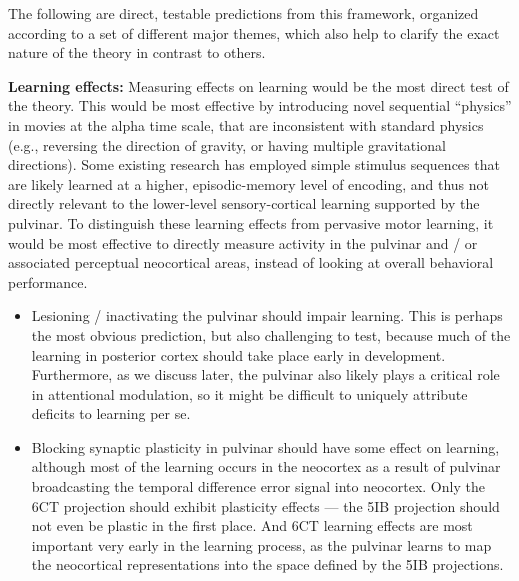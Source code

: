 \documentclass[11pt,twoside]{article}
\newif\myifpdf
\begin{document}
The following are direct, testable predictions from this framework, organized according to a set of different major themes, which also help to clarify the exact nature of the theory in contrast to others.

{\bf Learning effects:} Measuring effects on learning would be the most direct test of the theory.  This would be most effective by introducing novel sequential ``physics'' in movies at the alpha time scale, that are inconsistent with standard physics (e.g., reversing the direction of gravity, or having multiple gravitational directions).  Some existing research has employed simple stimulus sequences \cite{GavornikBear14,FiserMahringerOyiboEtAl16} that are likely learned at a higher, episodic-memory level of encoding, and thus not directly relevant to the lower-level sensory-cortical learning supported by the pulvinar.  To distinguish these learning effects from pervasive motor learning, it would be most effective to directly measure activity in the pulvinar and / or associated perceptual neocortical areas, instead of looking at overall behavioral performance.
\begin{itemize}
	\item Lesioning / inactivating the pulvinar should impair learning.  This is perhaps the most obvious prediction, but also challenging to test, because much of the learning in posterior cortex should take place early in development.  Furthermore, as we discuss later, the pulvinar also likely plays a critical role in attentional modulation, so it might be difficult to uniquely attribute deficits to learning per se.
	\item Blocking synaptic plasticity in pulvinar should have some effect on learning, although most of the learning occurs in the neocortex as a result of pulvinar broadcasting the temporal difference error signal into neocortex.  Only the 6CT projection should exhibit plasticity effects --- the 5IB projection should not even be plastic in the first place.  And 6CT learning effects are most important very early in the learning process, as the pulvinar learns to map the neocortical representations into the space defined by the 5IB projections.  
\end{itemize}
\end{document}
